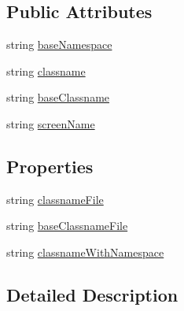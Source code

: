 \subsection*{Public Attributes}
\begin{DoxyCompactItemize}
\item 
string \hyperlink{class_unity_engine_1_1_u_i_1_1_windows_1_1_plugins_1_1_flow_compiler_1_1_tpl_1_1_info_aa0bbcea5d54ea9162b99b571d448786f}{base\+Namespace}
\item 
string \hyperlink{class_unity_engine_1_1_u_i_1_1_windows_1_1_plugins_1_1_flow_compiler_1_1_tpl_1_1_info_a1ace9f54a19a40d1f0581a1c378e690b}{classname}
\item 
string \hyperlink{class_unity_engine_1_1_u_i_1_1_windows_1_1_plugins_1_1_flow_compiler_1_1_tpl_1_1_info_ae709ff8981409c3d168400e8acc92d69}{base\+Classname}
\item 
string \hyperlink{class_unity_engine_1_1_u_i_1_1_windows_1_1_plugins_1_1_flow_compiler_1_1_tpl_1_1_info_afab2cf612ecd5c1065d2c1e4953e8169}{screen\+Name}
\end{DoxyCompactItemize}
\subsection*{Properties}
\begin{DoxyCompactItemize}
\item 
string \hyperlink{class_unity_engine_1_1_u_i_1_1_windows_1_1_plugins_1_1_flow_compiler_1_1_tpl_1_1_info_a2d170b46d8345327e32bae0c264c4536}{classname\+File}
\item 
string \hyperlink{class_unity_engine_1_1_u_i_1_1_windows_1_1_plugins_1_1_flow_compiler_1_1_tpl_1_1_info_ac6f8e02975a2baa0156cb83074658fee}{base\+Classname\+File}
\item 
string \hyperlink{class_unity_engine_1_1_u_i_1_1_windows_1_1_plugins_1_1_flow_compiler_1_1_tpl_1_1_info_a8b9894f34390b15747ebcdbda3a84f86}{classname\+With\+Namespace}
\end{DoxyCompactItemize}


\subsection{Detailed Description}


